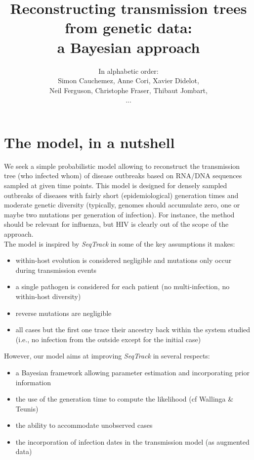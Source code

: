 \documentclass[10pt]{article}
\author{In alphabetic order: \\Simon Cauchemez, Anne Cori, Xavier Didelot, \\Neil Ferguson, Christophe Fraser, Thibaut Jombart,\\...}
\title{Reconstructing transmission trees from genetic data: \\a Bayesian approach}
\begin{document}
\maketitle

\section*{The model, in a nutshell}
We seek a simple probabilistic model allowing to reconstruct the transmission tree (who infected whom) of disease outbreaks based on RNA/DNA sequences sampled at given time points.
This model is designed for densely sampled outbreaks of diseases with fairly short (epidemiological) generation times and moderate genetic diversity (typically, genomes should accumulate zero, one or maybe two mutations per generation of infection).
For instance, the method should be relevant for influenza, but HIV is clearly out of the scope of the approach.
\\

The model is inspired by \textit{SeqTrack} in some of the key assumptions it makes: 
\begin{itemize}
\item within-host evolution is considered negligible and mutations only occur during transmission events
\item a single pathogen is considered for each patient (no multi-infection, no within-host diversity)
\item reverse mutations are negligible
\item all cases but the first one trace their ancestry back within the system studied (i.e., no infection from the outside except for the initial case)
\end{itemize}

However, our model aims at improving \textit{SeqTrack} in several respects:
\begin{itemize}
\item a Bayesian framework allowing parameter estimation and incorporating prior information
\item the use of the generation time to compute the likelihood (cf Wallinga \& Teunis)
\item the ability to accommodate unobserved cases
\item the incorporation of infection dates in the transmission model (as augmented data)
\end{itemize}
\end{document}
